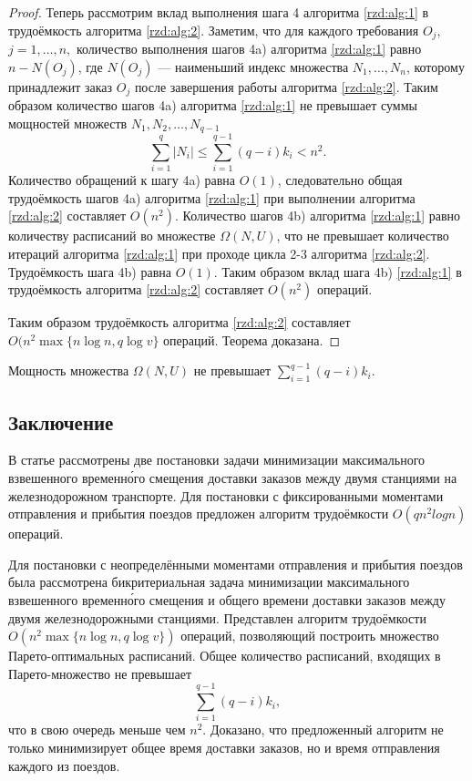 \begin{proof}
Теперь рассмотрим вклад выполнения шага 4 алгоритма \ref{rzd:alg:1} в трудоёмкость алгоритма \ref{rzd:alg:2}. Заметим, что для каждого требования $O_j$, $j=1, \dots, n,$ количество выполнения шагов 4a) алгоритма \ref{rzd:alg:1} равно $n-N(O_j)$, где $N(O_j)$ --- наименьший индекс множества $N_1, \dots, N_n$, которому принадлежит заказ $O_j$ после завершения работы алгоритма \ref{rzd:alg:2}. Таким образом количество шагов 4a) алгоритма \ref{rzd:alg:1} не превышает суммы мощностей множеств $N_1, N_2, \dots , N_{q-1}$
$$\sum\limits_{i=1}^{q} |N_i| \leq \sum\limits_{i=1}^{q-1} (q-i)k_i < n^2.$$
Количество обращений к шагу 4a) равна $O(1)$, следовательно общая трудоёмкость шагов 4a) алгоритма \ref{rzd:alg:1} при выполнении алгоритма \ref{rzd:alg:2} составляет $O(n^2)$.
Количество шагов 4b) алгоритма \ref{rzd:alg:1} равно количеству расписаний во множестве $\Omega(N,U)$, что не превышает количество итераций алгоритма \ref{rzd:alg:1} при проходе цикла 2-3 алгоритма \ref{rzd:alg:2}. Трудоёмкость шага 4b) равна $O(1)$. Таким образом вклад шага 4b) \ref{rzd:alg:1} в трудоёмкость алгоритма \ref{rzd:alg:2} составляет $O(n^2)$ операций.

Таким образом трудоёмкость алгоритма \ref{rzd:alg:2} составляет $O(n^2 \max\{n \log n, q \log v\}$ операций. Теорема доказана.
\end{proof}
\begin{corollary}\label{rzd:col:2}
Мощность множества $\Omega(N,U)$ не превышает $\sum\limits_{i=1}^{q-1} (q-i)k_i$.
\end{corollary}

\subsection{Заключение}\label{rzd:sec:concl:9}
  В статье рассмотрены две постановки задачи минимизации максимального взвешенного временн\'{о}го смещения доставки заказов между двумя станциями на железнодорожном транспорте. Для постановки с фиксированными моментами отправления и прибытия поездов предложен алгоритм трудоёмкости $O(q n^2 log n)$ операций.

  Для постановки с неопределёнными моментами отправления и прибытия поездов была рассмотрена бикритериальная задача минимизации максимального взвешенного временн\'{о}го смещения и общего времени доставки заказов между двумя железнодорожными станциями. Представлен алгоритм трудоёмкости $O(n^2 \max\{n \log n, q \log v\})$ операций, позволяющий построить множество Парето-оптимальных расписаний. Общее количество расписаний, входящих в Парето-множество не превышает
$$\sum\limits_{i=1}^{q-1} (q-i)k_i,$$
что в свою очередь меньше чем $n^2$. Доказано, что предложенный алгоритм не только минимизирует общее время доставки заказов, но и время отправления каждого из поездов. 